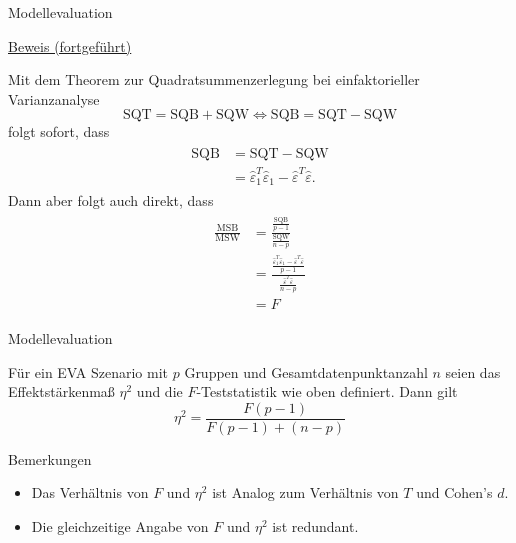 \documentclass[
  8pt,
  ignorenonframetext,
]{beamer}
\providecommand{\tightlist}{%
  \setlength{\itemsep}{0pt}\setlength{\parskip}{0pt}}
\begin{document}
\begin{frame}{Modellevaluation}
\protect\hypertarget{modellevaluation-10}{}
\footnotesize

\underline{Beweis (fortgeführt)}

Mit dem Theorem zur Quadratsummenzerlegung bei einfaktorieller
Varianzanalyse \begin{equation}
\mbox{SQT}  =  \mbox{SQB} +  \mbox{SQW} \Leftrightarrow \mbox{SQB} = \mbox{SQT} - \mbox{SQW}
\end{equation} folgt sofort, dass \begin{align}
\begin{split}
\mbox{SQB}
& = \mbox{SQT} - \mbox{SQW} \\
& = \hat{\varepsilon}_1^T\hat{\varepsilon}_1 - \hat{\varepsilon}^T\hat{\varepsilon}.
\end{split}
\end{align} Dann aber folgt auch direkt, dass \begin{align}
\begin{split}
\frac{\mbox{MSB}}{\mbox{MSW}}
& = \frac{\frac{\mbox{SQB}}{p-1}}
       {\frac{\mbox{SQW}}{n-p}}
\\
& = \frac{\frac{\hat{\varepsilon}_1^T\hat{\varepsilon}_1 - \hat{\varepsilon}^T\hat{\varepsilon}}{p-1}}
       {\frac{\hat{\varepsilon}^T\hat{\varepsilon}}{n-p}}
\\
& =  F
\end{split}
\end{align}
\end{frame}

\begin{frame}{Modellevaluation}
\protect\hypertarget{modellevaluation-11}{}
\footnotesize

\begin{theorem}
\justifying
\normalfont
Für ein EVA Szenario mit $p$ Gruppen und Gesamtdatenpunktanzahl $n$ seien das 
Effektstärkenmaß $\eta^2$ und die $F$-Teststatistik wie oben definiert. Dann gilt
\begin{equation}
\eta^2 = \frac{F(p-1)}{F(p-1) + (n-p)}
\end{equation}
\end{theorem}

Bemerkungen

\begin{itemize}
\tightlist
\item
  Das Verhältnis von \(F\) und \(\eta^2\) ist Analog zum Verhältnis von
  \(T\) und Cohen's \(d\).
\item
  Die gleichzeitige Angabe von \(F\) und \(\eta^2\) ist redundant.
\end{itemize}
\end{frame}
\end{document}
